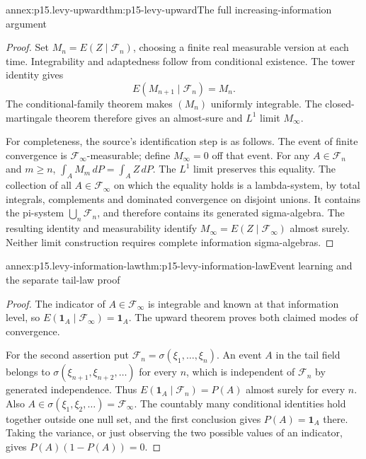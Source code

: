 \begin{annexitem}{annex:p15.levy-upward}{thm:p15-levy-upward}{The full increasing-information argument}
\begin{proof}
Set \(M_n=E(Z\mid\mathcal F_n)\), choosing a finite real measurable
version at each time. Integrability and adaptedness follow from
conditional existence. The tower identity gives
\[
                    E(M_{n+1}\mid\mathcal F_n)=M_n.
\]
The conditional-family theorem makes \((M_n)\) uniformly integrable.
The closed-martingale theorem therefore gives an almost-sure and
\(L^1\) limit \(M_\infty\).

For completeness, the source's identification step is as follows.
The event of finite convergence is \(\mathcal F_\infty\)-measurable;
define \(M_\infty=0\) off that event. For any \(A\in\mathcal F_n\)
and \(m\geq n\),
\(\int_A M_m\,dP=\int_A Z\,dP\). The \(L^1\) limit preserves this equality.
The collection of all \(A\in\mathcal F_\infty\) on which the equality
holds is a lambda-system, by total integrals, complements and dominated
convergence on disjoint unions. It contains the pi-system
\(\bigcup_n\mathcal F_n\), and therefore contains its generated
sigma-algebra. The resulting identity and measurability identify
\(M_\infty=E(Z\mid\mathcal F_\infty)\) almost surely.
Neither limit construction requires complete information sigma-algebras.
\end{proof}
\end{annexitem}

\begin{annexitem}{annex:p15.levy-information-law}{thm:p15-levy-information-law}{Event learning and the separate tail-law proof}
\begin{proof}
The indicator of \(A\in\mathcal F_\infty\) is integrable and known at
that information level, so \(E(\mathbf1_A\mid\mathcal F_\infty)=\mathbf1_A\).
The upward theorem proves both claimed modes of convergence.

For the second assertion put
\(\mathcal F_n=\sigma(\xi_1,\ldots,\xi_n)\).
An event \(A\) in the tail field belongs to
\(\sigma(\xi_{n+1},\xi_{n+2},\ldots)\) for every \(n\), which is
independent of \(\mathcal F_n\) by generated independence.
Thus \(E(\mathbf1_A\mid\mathcal F_n)=P(A)\) almost surely for every \(n\).
Also \(A\in\sigma(\xi_1,\xi_2,\ldots)=\mathcal F_\infty\).
The countably many conditional identities hold together outside one
null set, and the first conclusion gives \(P(A)=\mathbf1_A\) there.
Taking the variance, or just observing the two possible values of an
indicator, gives \(P(A)(1-P(A))=0\).
\end{proof}
\end{annexitem}

